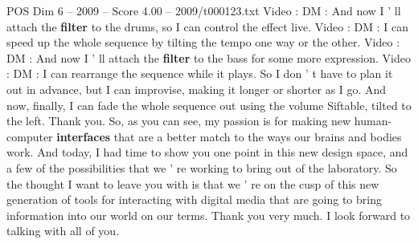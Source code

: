 \begin{textsample}{POS Dim 6 – 2009 – Score 4.00 – 2009/t000123.txt}
Video : DM : And now I ' ll attach the \textbf{filter} to the drums, so I can control the effect live.
Video : DM : I can speed up the whole sequence by tilting the tempo one way or the other.
Video : DM : And now I ' ll attach the \textbf{filter} to the bass for some more expression.
Video : DM : I can rearrange the sequence while it plays.
So I don ' t have to plan it out in advance, but I can improvise, making it longer or shorter as I go.
And now, finally, I can fade the whole sequence out using the volume Siftable, tilted to the left.
Thank you.
So, as you can see, my passion is for making new human-computer \textbf{interfaces} that are a better match to the ways our brains and bodies work.
And today, I had time to show you one point in this new design space, and a few of the possibilities that we ' re working to bring out of the laboratory.
So the thought I want to leave you with is that we ' re on the cusp of this new generation of tools for interacting with digital media that are going to bring information into our world on our terms.
Thank you very much.
I look forward to talking with all of you.

\end{textsample}
